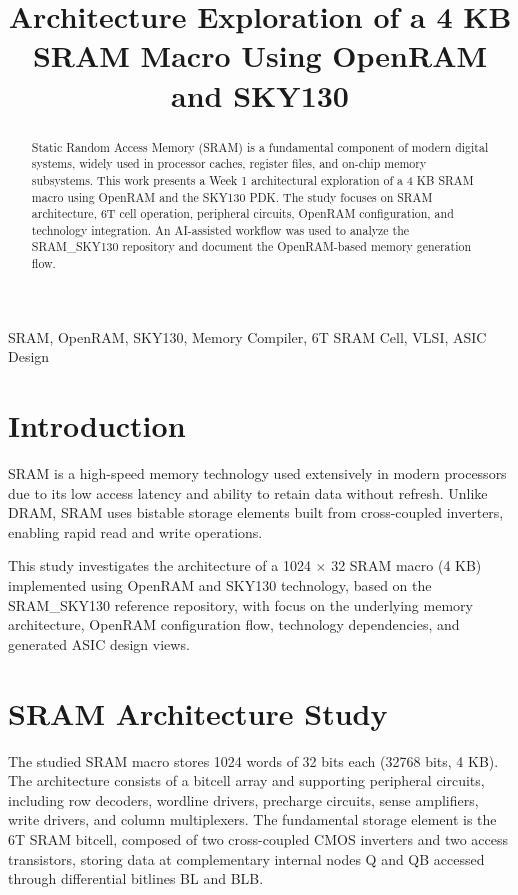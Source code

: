 \documentclass[conference]{IEEEtran}
\begin{document}
\title{\vspace{-0.8cm}
Architecture Exploration of a 4 KB SRAM Macro Using OpenRAM and SKY130
\vspace{-0.5cm}}

\author{
}


\maketitle

\begin{abstract}
Static Random Access Memory (SRAM) is a fundamental component of modern digital systems, widely used in processor caches, register files, and on-chip memory subsystems. This work presents a Week 1 architectural exploration of a 4 KB SRAM macro using OpenRAM and the SKY130 PDK. The study focuses on SRAM architecture, 6T cell operation, peripheral circuits, OpenRAM configuration, and technology integration. An AI-assisted workflow was used to analyze the SRAM\_SKY130 repository and document the OpenRAM-based memory generation flow.
\end{abstract}

\begin{IEEEkeywords}
SRAM, OpenRAM, SKY130, Memory Compiler, 6T SRAM Cell, VLSI, ASIC Design
\end{IEEEkeywords}

\section{Introduction}
SRAM is a high-speed memory technology used extensively in modern processors due to its low access latency and ability to retain data without refresh. Unlike DRAM, SRAM uses bistable storage elements built from cross-coupled inverters, enabling rapid read and write operations.

This study investigates the architecture of a 1024 $\times$ 32 SRAM macro (4 KB) implemented using OpenRAM and SKY130 technology, based on the SRAM\_SKY130 reference repository, with focus on the underlying memory architecture, OpenRAM configuration flow, technology dependencies, and generated ASIC design views.

\section{SRAM Architecture Study}
The studied SRAM macro stores 1024 words of 32 bits each (32768 bits, 4 KB). The architecture consists of a bitcell array and supporting peripheral circuits, including row decoders, wordline drivers, precharge circuits, sense amplifiers, write drivers, and column multiplexers. The fundamental storage element is the 6T SRAM bitcell, composed of two cross-coupled CMOS inverters and two access transistors, storing data at complementary internal nodes Q and QB accessed through differential bitlines BL and BLB.
\end{document}
